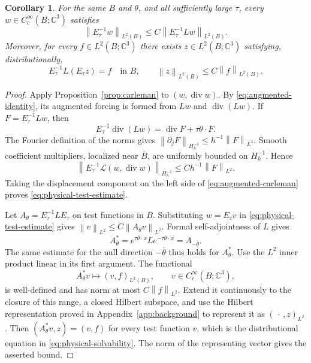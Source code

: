 \documentclass[11pt]{article}
\newcommand{\C}{\mathbb C}
\DeclareMathOperator{\diverg}{div}
\newcommand{\norm}[1]{\left\lVert #1\right\rVert}
\newcommand{\Lcal}{\mathcal L}
\newtheorem{corollary}[theorem]{Corollary}
\theoremstyle{remark}
\numberwithin{equation}{section}
\begin{document}
\begin{corollary}
\label{cor:physical-solvability}
For the same $B$ and $\theta$, and all sufficiently large $\tau$,
every $w\in C_c^\infty(B;\C^3)$
satisfies
\begin{equation}
\label{eq:physical-test-estimate}
 \norm{E_\tau^{-1}w}_{L^2(B)}
 \le C\norm{E_\tau^{-1}Lw}_{L^2(B)}.
\end{equation}
Moreover, for every $f\in L^2(B;\C^3)$ there exists
$z\in L^2(B;\C^3)$ satisfying, distributionally,
\begin{equation}
\label{eq:physical-solvability}
 E_\tau^{-1}L(E_\tau z)=f\quad\text{in }B,
 \qquad \norm{z}_{L^2(B)}\le C\norm{f}_{L^2(B)}.
\end{equation}
\end{corollary}

\begin{proof}
Apply Proposition~\ref{prop:carleman} to $(w,\diverg w)$.
By \eqref{eq:augmented-identity}, its augmented forcing is formed
from $Lw$ and $\diverg(Lw)$. If $F=E_\tau^{-1}Lw$, then
\[
 E_\tau^{-1}\diverg(Lw)=\diverg F+\tau\theta\cdot F.
\]
The Fourier definition of the norms gives
$\norm{\partial_jF}_{H_h^{-1}}\le h^{-1}\norm{F}_{L^2}$.
Smooth coefficient multipliers, localized near $\overline B$, are
uniformly bounded on $H_h^{-1}$. Hence
\[
 \norm{E_\tau^{-1}\Lcal(w,\diverg w)}_{H_h^{-1}}
 \le Ch^{-1}\norm{F}_{L^2}.
\]
Taking the displacement component on the left side of
\eqref{eq:augmented-carleman} proves
\eqref{eq:physical-test-estimate}.

Let $A_\theta=E_\tau^{-1}LE_\tau$ on test functions in $B$.
Substituting $w=E_\tau v$ in
\eqref{eq:physical-test-estimate} gives
$\norm{v}_{L^2}\le C\norm{A_\theta v}_{L^2}$.
Formal self-adjointness of $L$ gives
\[
 A_\theta^*
 =e^{\tau\overline\theta\cdot x}L
                      e^{-\tau\overline\theta\cdot x}
 =A_{-\overline\theta}.
\]
The same estimate for the null direction $-\overline\theta$ thus
holds for $A_\theta^*$. Use the $L^2$ inner product linear in its
first argument. The functional
\[
 A_\theta^*v\longmapsto (v,f)_{L^2(B)},
 \qquad v\in C_c^\infty(B;\C^3),
\]
is well-defined and has norm at most $C\norm{f}_{L^2}$. Extend it continuously to the closure of this range, a closed Hilbert
subspace, and use the Hilbert representation proved in
Appendix~\ref{app:background} to represent it as $(\,\cdot\,,z)_{L^2}$.
Then $(A_\theta^*v,z)=(v,f)$ for every test function $v$, which is
the distributional equation in \eqref{eq:physical-solvability}.
The norm of the representing vector gives the asserted bound.
\end{proof}
\end{document}
